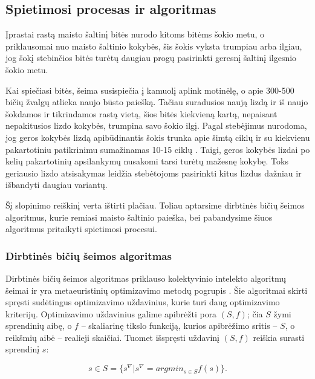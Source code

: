 \documentclass{VUMIFKompMagistrinis}
\begin{document}
\subsection{Spietimosi procesas ir algoritmas}

 Įprastai rastą maisto šaltinį bitės nurodo kitoms bitėms šokio metu, o priklausomai nuo maisto šaltinio kokybės, šis šokis vyksta trumpiau arba ilgiau, jog šokį stebinčios bitės turėtų daugiau progų pasirinkti geresnį šaltinį ilgesnio šokio metu. 
 
 Kai spiečiasi bitės, šeima susispiečia į kamuolį aplink motinėlę, o apie 300-500 bičių žvalgų atlieka naujo būsto paiešką. Tačiau suradusios naują lizdą ir iš naujo šokdamos ir tikrindamos rastą vietą, šios bitės kiekvieną kartą, nepaisant nepakitusios lizdo kokybės, trumpina savo šokio ilgį. Pagal stebėjimus nurodoma, jog geros kokybės lizdą apibūdinantis šokis trunka apie šimtą ciklų ir su kiekvienu pakartotiniu patikrinimu sumažinamas 10-15 ciklų \cite{See10}. Taigi, geros kokybės lizdai po kelių pakartotinių apsilankymų nusakomi tarsi turėtų mažesnę kokybę. Toks geriausio lizdo atsisakymas leidžia stebėtojoms pasirinkti kitus lizdus dažniau ir išbandyti daugiau variantų. 
 
 Šį slopinimo reiškinį verta ištirti plačiau. Toliau aptarsime dirbtinės bičių šeimos algoritmus, kurie remiasi maisto šaltinio paieška, bei pabandysime šiuos algoritmus pritaikyti spietimosi procesui.


\subsubsection{Dirbtinės bičių šeimos algoritmas}



Dirbtinės bičių šeimos algoritmas \cite{KaB07} priklauso kolektyvinio intelekto algoritmų šeimai ir yra metaeuristinių optimizavimo metodų pogrupis \cite{MBB11}.
Šie algoritmai skirti spręsti sudėtingus optimizavimo uždavinius, kurie turi daug optimizavimo kriterijų.
Optimizavimo uždavinius galime apibrėžti pora $(S, f)$; čia $S$ žymi sprendinių aibę, o $f$ – skaliarinę tikslo funkciją, kurios apibrėžimo sritis – $S$, o reikšmių aibė – realieji skaičiai. Tuomet išspręsti uždavinį $(S, f)$ reiškia surasti sprendinį $s$:

\begin{equation}\label{sol}
s \in  S = \{s^{\nabla} | s^{\nabla} = argmin_{s \in S} f(s)\}.
\end{equation}
\end{document}

